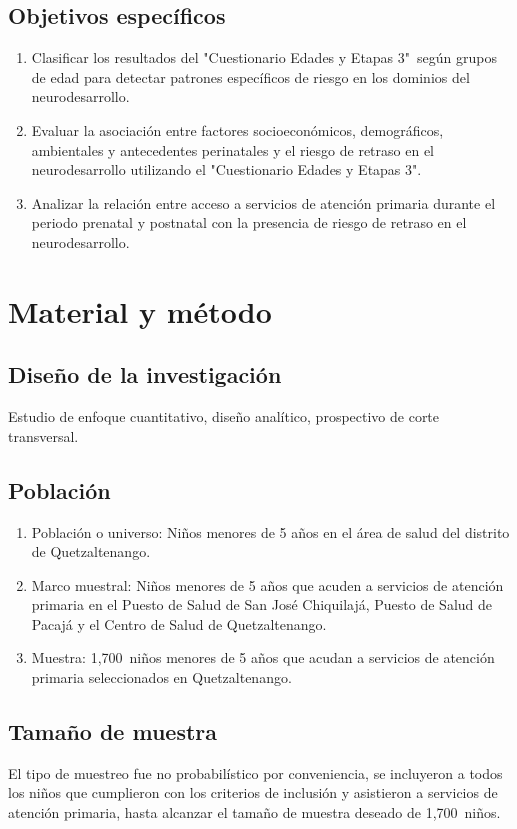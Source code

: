 \documentclass[11pt,letterpaper]{report}
\newcommand{\tiempito}{durante 2,025}
\newcommand{\muestradeseada}{1,700}
\newcommand{\asq}{"Cuestionario Edades y Etapas 3"}
\begin{document}
\section{Objetivos específicos}
	\begin{enumerate}
		\item Clasificar los resultados del \asq\ según grupos de edad para
		detectar patrones específicos de riesgo en los dominios del
		neurodesarrollo.
		
		\item Evaluar la asociación entre factores socioeconómicos,
		demográficos, ambientales y antecedentes perinatales y el riesgo de
		retraso en el neurodesarrollo utilizando el \asq.
		
		\item Analizar la relación entre acceso a servicios de atención
		primaria durante el periodo prenatal y postnatal con la presencia de
		riesgo de retraso en el neurodesarrollo.
	\end{enumerate}

	\chapter{Material y método}
\section{Diseño de la investigación}
Estudio de enfoque cuantitativo, diseño analítico, prospectivo
de corte transversal.

\section{Población}
	\begin{enumerate}
		\item Población o universo: Niños menores de 5 años en el área de salud
		del distrito de Quetzaltenango.
		\item Marco muestral: Niños menores de 5 años que acuden a servicios de
		atención primaria en el Puesto de Salud de San José Chiquilajá, Puesto
		de Salud de Pacajá y el Centro de Salud de Quetzaltenango. %
		\item Muestra: \muestradeseada\ niños menores de 5 años que acudan a
		servicios de atención primaria seleccionados en Quetzaltenango.
	\end{enumerate}

\section{Tamaño de muestra}
El tipo de muestreo fue no probabilístico por conveniencia, se incluyeron a
todos los niños que cumplieron con los criterios de inclusión y asistieron a
servicios de atención primaria, hasta alcanzar el tamaño de muestra deseado
de \muestradeseada\ niños.
\end{document}
